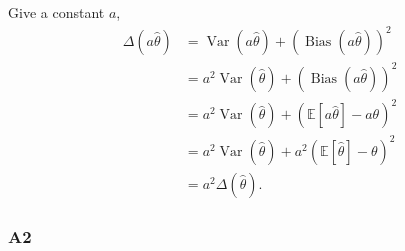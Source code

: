 \begin{remark}\label{rem:MSE-a}
    Give a constant $a$,
    \begin{align}
    \Delta(a\hat{\theta}) & = \operatorname{Var}(a\hat{\theta}) + (\operatorname{Bias}(a\hat{\theta}))^2 \\
    & =  a^2 \operatorname{Var}(\hat{\theta}) + (\operatorname{Bias}(a\hat{\theta}))^2 \\
    & =  a^2 \operatorname{Var}(\hat{\theta}) + (\mathbb{E}[a\hat{\theta}] -a \theta)^2 \\
    & =  a^2 \operatorname{Var}(\hat{\theta}) + a^2 (\mathbb{E}[\hat{\theta}] -\theta)^2 \\
    & = a^2 \Delta(\hat{\theta}).
\end{align}
\end{remark}

\subsubsection{A2} \label{app2}

